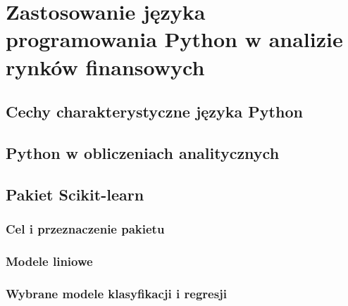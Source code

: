 
\chapter{Zastosowanie języka programowania Python w analizie rynków finansowych}
\section{Cechy charakterystyczne języka Python}
\section{Python w obliczeniach analitycznych}
\section{Pakiet Scikit-learn}
\subsection{Cel i przeznaczenie pakietu}
\subsection{Modele liniowe}
\subsection{Wybrane modele klasyfikacji i regresji}
